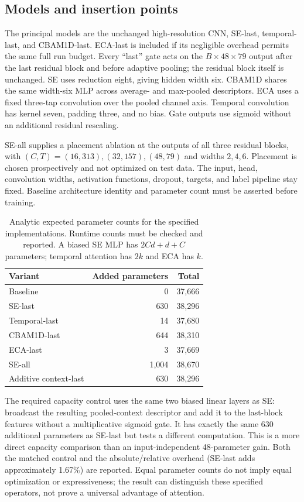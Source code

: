 \documentclass[11pt]{article}
\begin{document}
\subsection{Models and insertion points}
The principal models are the unchanged high-resolution CNN, SE-last, temporal-last, and CBAM1D-last. ECA-last is included if its negligible overhead permits the same full run budget. Every ``last'' gate acts on the $B\times48\times79$ output after the last residual block and before adaptive pooling; the residual block itself is unchanged. SE uses reduction eight, giving hidden width six. CBAM1D shares the same width-six MLP across average- and max-pooled descriptors. ECA uses a fixed three-tap convolution over the pooled channel axis. Temporal convolution has kernel seven, padding three, and no bias. Gate outputs use sigmoid without an additional residual rescaling.

SE-all supplies a placement ablation at the outputs of all three residual blocks, with $(C,T)=(16,313),(32,157),(48,79)$ and widths $2,4,6$. Placement is chosen prospectively and not optimized on test data. The input, head, convolution widths, activation functions, dropout, targets, and label pipeline stay fixed. Baseline architecture identity and parameter count must be asserted before training.

\begin{table}[t]
\centering\small
\begin{tabular}{lrr}
\toprule
Variant & Added parameters & Total\\
\midrule
Baseline & 0 & 37,666\\
SE-last & 630 & 38,296\\
Temporal-last & 14 & 37,680\\
CBAM1D-last & 644 & 38,310\\
ECA-last & 3 & 37,669\\
SE-all & 1,004 & 38,670\\
Additive context-last & 630 & 38,296\\
\bottomrule
\end{tabular}
\caption{Analytic expected parameter counts for the specified implementations. Runtime counts must be checked and reported. A biased SE MLP has $2Cd+d+C$ parameters; temporal attention has $2k$ and ECA has $k$.}
\label{tab:capacity}
\end{table}

The required capacity control uses the same two biased linear layers as SE: broadcast the resulting pooled-context descriptor and add it to the last-block features without a multiplicative sigmoid gate. It has exactly the same 630 additional parameters as SE-last but tests a different computation. This is a more direct capacity comparison than an input-independent 48-parameter gain. Both the matched control and the absolute/relative overhead (SE-last adds approximately 1.67\%) are reported. Equal parameter counts do not imply equal optimization or expressiveness; the result can distinguish these specified operators, not prove a universal advantage of attention.
\end{document}
